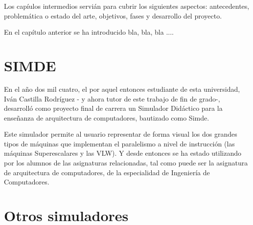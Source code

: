 

Los capíulos intermedios servián para cubrir los siguientes aspectos:
antecedentes, problemática o estado del arte, objetivos, fases y 
desarrollo del proyecto.

En el capítulo anterior se ha introducido bla, bla, bla ....


\section{SIMDE}
\label{2:sec1}

En el año dos mil cuatro, el por aquel entonces estudiante de esta universidad, 
Iván Castilla Rodríguez - y ahora tutor de este trabajo de fin de grado-, 
desarrolló como proyecto final de carrera un Simulador Didáctico para la enseñanza 
de arquitectura de computadores, bautizado como Simde. 

\bigskip
Este simulador permite al usuario representar de forma visual los dos grandes tipos 
de máquinas que implementan el paralelismo a nivel de instrucción (las máquinas 
Superescalares y las VLW). Y desde entonces se ha estado utilizando por los alumnos 
de las asignaturas relacionadas, tal como puede ser la asignatura de arquitectura de 
computadores, de la especialidad de Ingeniería de Computadores.

\section{Otros simuladores}
\label{2:sec2}


